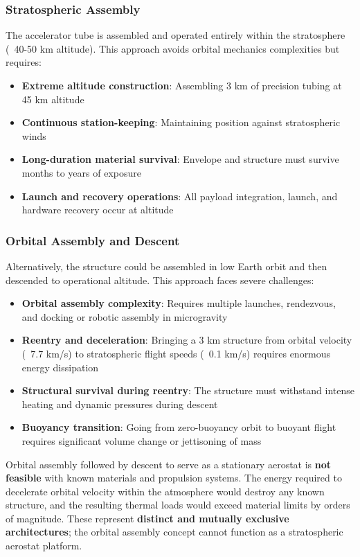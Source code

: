 \documentclass[12pt]{article}
\begin{document}
\begin{itemize}
\subsubsection{Stratospheric Assembly}
The accelerator tube is assembled and operated entirely within the stratosphere (~40-50 km altitude). This approach avoids orbital mechanics complexities but requires:
\begin{itemize}
    \item \textbf{Extreme altitude construction}: Assembling 3 km of precision tubing at 45 km altitude
    \item \textbf{Continuous station-keeping}: Maintaining position against stratospheric winds
    \item \textbf{Long-duration material survival}: Envelope and structure must survive months to years of exposure
    \item \textbf{Launch and recovery operations}: All payload integration, launch, and hardware recovery occur at altitude
\end{itemize}

\subsubsection{Orbital Assembly and Descent}
Alternatively, the structure could be assembled in low Earth orbit and then descended to operational altitude. This approach faces severe challenges:
\begin{itemize}
    \item \textbf{Orbital assembly complexity}: Requires multiple launches, rendezvous, and docking or robotic assembly in microgravity
    \item \textbf{Reentry and deceleration}: Bringing a 3 km structure from orbital velocity (~7.7 km/s) to stratospheric flight speeds (~0.1 km/s) requires enormous energy dissipation
    \item \textbf{Structural survival during reentry}: The structure must withstand intense heating and dynamic pressures during descent
    \item \textbf{Buoyancy transition}: Going from zero-buoyancy orbit to buoyant flight requires significant volume change or jettisoning of mass
\end{itemize}
Orbital assembly followed by descent to serve as a stationary aerostat is \textbf{not feasible} with known materials and propulsion systems. The energy required to decelerate orbital velocity within the atmosphere would destroy any known structure, and the resulting thermal loads would exceed material limits by orders of magnitude. These represent \textbf{distinct and mutually exclusive architectures}; the orbital assembly concept cannot function as a stratospheric aerostat platform.


\end{itemize}
\end{document}
